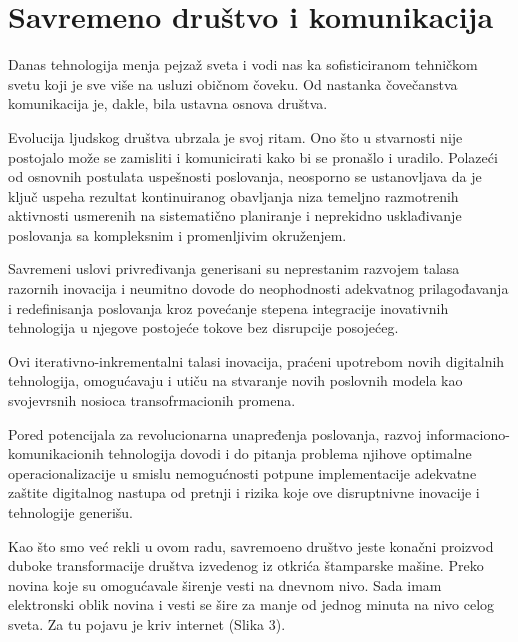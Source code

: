 \documentclass[12pt]{article}
\begin{document}
   
    \section{Savremeno društvo i komunikacija}
    
    
	Danas tehnologija menja pejzaž sveta i vodi nas ka sofisticiranom tehničkom svetu koji je sve više na usluzi običnom čoveku. Od nastanka čovečanstva komunikacija je, dakle, bila ustavna osnova društva.
	
	Evolucija ljudskog društva ubrzala je svoj ritam. Ono što u stvarnosti nije postojalo može se zamisliti i komunicirati kako bi se pronašlo i uradilo. Polazeći od osnovnih postulata uspešnosti poslovanja, neosporno se ustanovljava da je ključ uspeha rezultat kontinuiranog obavljanja niza temeljno razmotrenih aktivnosti usmerenih na sistematično planiranje i neprekidno usklađivanje poslovanja sa kompleksnim i promenljivim okruženjem. 
	
	Savremeni uslovi privređivanja generisani su neprestanim razvojem talasa razornih inovacija i neumitno dovode do neophodnosti adekvatnog prilagođavanja i redefinisanja poslovanja kroz povećanje stepena integracije inovativnih tehnologija u njegove postojeće tokove bez disrupcije posojećeg.
	
	Ovi iterativno-inkrementalni talasi inovacija, praćeni upotrebom novih digitalnih tehnologija, omogućavaju i utiču na stvaranje novih poslovnih modela kao svojevrsnih nosioca transofrmacionih promena. 
	
	Pored potencijala za revolucionarna unapređenja poslovanja, razvoj informaciono-komunikacionih tehnologija dovodi i do pitanja problema njihove optimalne operacionalizacije u smislu nemogućnosti potpune implementacije adekvatne zaštite digitalnog nastupa od pretnji i rizika koje ove disruptnivne inovacije i tehnologije generišu.
	
	Kao što smo već rekli u ovom radu, savremoeno društvo jeste konačni proizvod duboke transformacije društva izvedenog iz otkrića štamparske mašine. Preko novina koje su omogućavale širenje vesti na dnevnom nivo. Sada imam elektronski oblik novina i vesti se šire za manje od jednog minuta na nivo celog sveta.  Za tu pojavu je kriv internet (Slika 3). 
\end{document}
